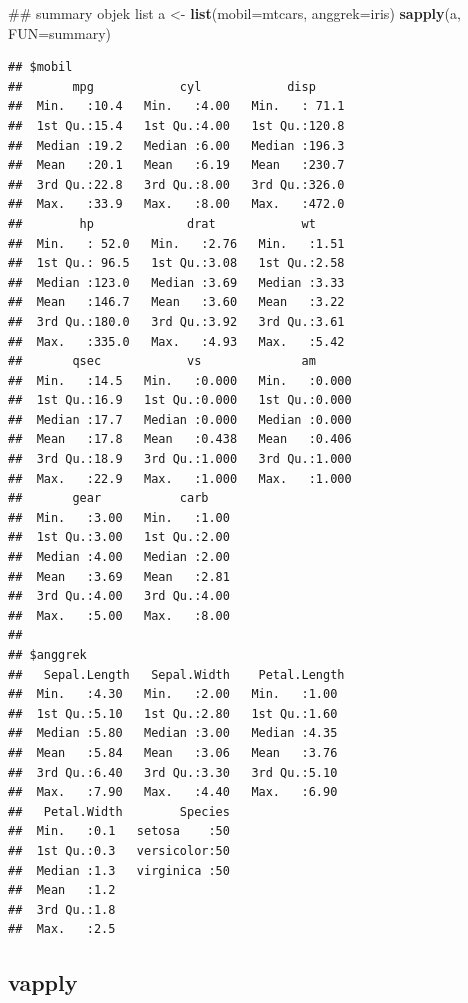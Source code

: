 \documentclass[]{book}
\newenvironment{Shaded}{\begin{snugshade}}{\end{snugshade}}
\newcommand{\KeywordTok}[1]{\textcolor[rgb]{0.13,0.29,0.53}{\textbf{#1}}}
\newcommand{\DataTypeTok}[1]{\textcolor[rgb]{0.13,0.29,0.53}{#1}}
\newcommand{\StringTok}[1]{\textcolor[rgb]{0.31,0.60,0.02}{#1}}
\newcommand{\NormalTok}[1]{#1}
\begin{document}
\begin{Shaded}
\begin{Highlighting}[]
\NormalTok{## summary objek list}
\NormalTok{a <-}\StringTok{ }\KeywordTok{list}\NormalTok{(}\DataTypeTok{mobil=}\NormalTok{mtcars, }\DataTypeTok{anggrek=}\NormalTok{iris)}
\KeywordTok{sapply}\NormalTok{(a, }\DataTypeTok{FUN=}\NormalTok{summary)}
\end{Highlighting}
\end{Shaded}

\begin{verbatim}
## $mobil
##       mpg            cyl            disp      
##  Min.   :10.4   Min.   :4.00   Min.   : 71.1  
##  1st Qu.:15.4   1st Qu.:4.00   1st Qu.:120.8  
##  Median :19.2   Median :6.00   Median :196.3  
##  Mean   :20.1   Mean   :6.19   Mean   :230.7  
##  3rd Qu.:22.8   3rd Qu.:8.00   3rd Qu.:326.0  
##  Max.   :33.9   Max.   :8.00   Max.   :472.0  
##        hp             drat            wt      
##  Min.   : 52.0   Min.   :2.76   Min.   :1.51  
##  1st Qu.: 96.5   1st Qu.:3.08   1st Qu.:2.58  
##  Median :123.0   Median :3.69   Median :3.33  
##  Mean   :146.7   Mean   :3.60   Mean   :3.22  
##  3rd Qu.:180.0   3rd Qu.:3.92   3rd Qu.:3.61  
##  Max.   :335.0   Max.   :4.93   Max.   :5.42  
##       qsec            vs              am       
##  Min.   :14.5   Min.   :0.000   Min.   :0.000  
##  1st Qu.:16.9   1st Qu.:0.000   1st Qu.:0.000  
##  Median :17.7   Median :0.000   Median :0.000  
##  Mean   :17.8   Mean   :0.438   Mean   :0.406  
##  3rd Qu.:18.9   3rd Qu.:1.000   3rd Qu.:1.000  
##  Max.   :22.9   Max.   :1.000   Max.   :1.000  
##       gear           carb     
##  Min.   :3.00   Min.   :1.00  
##  1st Qu.:3.00   1st Qu.:2.00  
##  Median :4.00   Median :2.00  
##  Mean   :3.69   Mean   :2.81  
##  3rd Qu.:4.00   3rd Qu.:4.00  
##  Max.   :5.00   Max.   :8.00  
## 
## $anggrek
##   Sepal.Length   Sepal.Width    Petal.Length 
##  Min.   :4.30   Min.   :2.00   Min.   :1.00  
##  1st Qu.:5.10   1st Qu.:2.80   1st Qu.:1.60  
##  Median :5.80   Median :3.00   Median :4.35  
##  Mean   :5.84   Mean   :3.06   Mean   :3.76  
##  3rd Qu.:6.40   3rd Qu.:3.30   3rd Qu.:5.10  
##  Max.   :7.90   Max.   :4.40   Max.   :6.90  
##   Petal.Width        Species  
##  Min.   :0.1   setosa    :50  
##  1st Qu.:0.3   versicolor:50  
##  Median :1.3   virginica :50  
##  Mean   :1.2                  
##  3rd Qu.:1.8                  
##  Max.   :2.5
\end{verbatim}

\subsection{vapply}\label{vapply}
\end{document}
